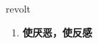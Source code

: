 
\begin{frame}
{\huge revolt}
\begin{center}
\begin{enumerate}\Large
  \item \textbf{使厌恶，使反感}
\end{enumerate}
\end{center}
\end{frame}
